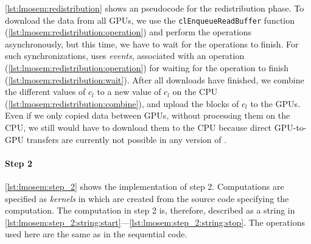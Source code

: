 \autoref{lst:lmosem:redistribution} shows an \OpenCL pseudocode for the redistribution phase.
To download the data from all GPUs, we use the \texttt{clEnqueueReadBuffer} function (\autoref{lst:lmosem:redistribution:operation}) and perform the operations asynchronously, but this time, we have to wait for the operations to finish.
For such synchronizations, \OpenCL uses \emph{events}, associated with an operation (\autoref{lst:lmosem:redistribution:operation}) for waiting for the operation to finish (\autoref{lst:lmosem:redistribution:wait}).
After all downloads have finished, we combine the different values of $c_l$ to a new value of $c_l$ on the CPU (\autoref{lst:lmosem:redistribution:combine}), and upload the blocks of $c_l$ to the GPUs.
Even if we only copied data between GPUs, without processing them on the CPU, we still would have to download them to the CPU because direct GPU-to-GPU transfers are currently not possible in any version of \OpenCL.

\paragraph{Step 2}
\autoref{lst:lmosem:step_2} shows the implementation of step 2.
Computations are specified as \emph{kernels} in \OpenCL which are created from the source code specifying the computation.
The computation in step 2 is, therefore, described as a string in \autoref{lst:lmosem:step_2:string:start}---\autoref{lst:lmosem:step_2:string:stop}.
The operations used here are the same as in the sequential code.

